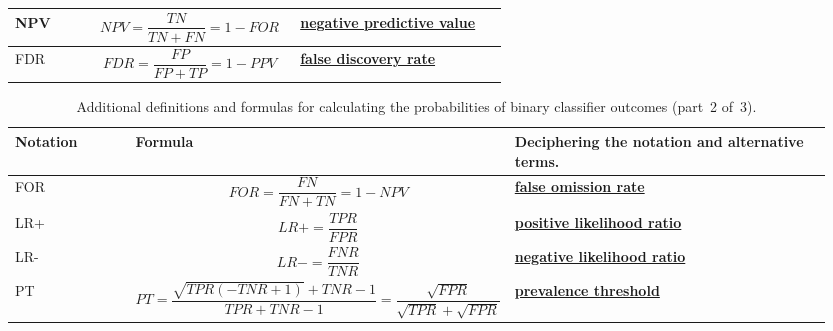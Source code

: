\documentclass[]{scrreprt}
\begin{document}
\begin{table}[htp]
\begin{tabularx}{\textwidth}{p{0.15\linewidth} p{0.4\linewidth} p{0.4\linewidth}}
		\hline
		NPV&\begin{equation}\label{eq:NPV}
		NPV = \frac{TN}{TN+FN} = 1 -FOR
		\end{equation}&\href{https://en.wikipedia.org/wiki/Positive_and_negative_predictive_values}{\textbf{negative predictive value}}~\cite{Wiki:PPV}\\
		\hline
		FDR&\begin{equation}\label{eq:FDR}
		FDR = \frac{FP}{FP + TP} = 1 - PPV
		\end{equation}&\href{https://en.wikipedia.org/wiki/False_discovery_rate}{\textbf{false discovery rate}}~\cite{Wiki:FDR}\\
		\hline
	\end{tabularx}
	\normalsize
\end{table}
%
\begin{table}[htp]
	\caption{Additional definitions and formulas for calculating the probabilities of binary classifier outcomes (part~2 of~3).}\label{tab:ROC-rates-2}
	\tiny
	\begin{tabularx}{\textwidth}{p{0.15\linewidth} p{0.4\linewidth} p{0.4\linewidth}} 
		\hline
		Notation&Formula&Deciphering the notation and alternative terms.\\
		\hline
		FOR&\begin{equation}\label{eq:FOR}
		FOR = \frac{FN}{FN+TN}=1-NPV
		\end{equation}&\href{https://en.wikipedia.org/wiki/Positive_and_negative_predictive_values}{\textbf{false omission rate}}~\cite{Wiki:PPV}\\
		\hline
		LR+&\begin{equation}\label{eq:LR+}
		LR+=\frac{TPR}{FPR}
		\end{equation}&\href{https://en.wikipedia.org/wiki/Likelihood_ratios_in_diagnostic_testing\#positive_likelihood_ratio}{\textbf{\textbf{positive likelihood ratio}}}~\cite{Wiki:likehoods-ratios}\\
		\hline
		LR-&\begin{equation}\label{eq:LR-}
		LR-=\frac{FNR}{TNR}
		\end{equation}&\href{https://en.wikipedia.org/wiki/Likelihood_ratios_in_diagnostic_testing\#negative_likelihood_ratio}{\textbf{negative likelihood ratio}}~\cite{Wiki:likehoods-ratios}\\
		\hline
		PT&\begin{equation}\label{eq:PT}
		PT=\frac{\sqrt{TPR(-TNR+1)}+TNR-1}{TPR+TNR-1}=\frac{\sqrt{FPR}}{\sqrt{TPR}+\sqrt{FPR}}
		\end{equation}&\href{https://en.wikipedia.org/wiki/Sensitivity_(test)}{\textbf{prevalence threshold}}~\cite{Wiki:sensitivity-and-specificity}\\

\end{tabularx}
\end{table}
\end{document}
